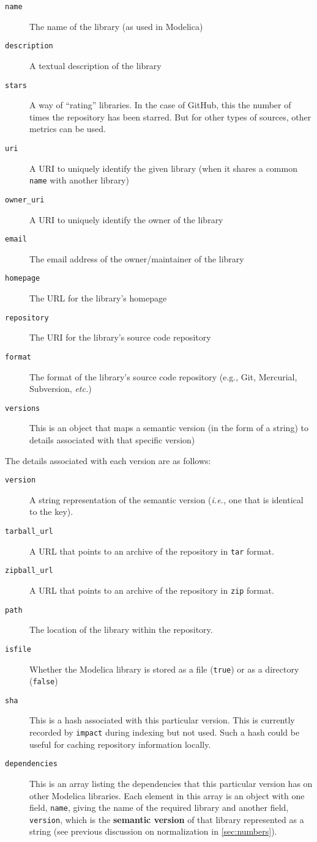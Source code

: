 \documentclass[11pt,a4paper,twocolumn]{article}
\newcommand{\code}[1]{\texttt{#1}} %
\begin{document}
\begin{description}
  \item[\code{name}] The name of the library (as used in Modelica)
  \item[\code{description}] A textual description of the library
  \item[\code{stars}] A way of ``rating'' libraries.  In the case of
    GitHub, this the number of times the repository has been starred.
    But for other types of sources, other metrics can be used.
  \item[\code{uri}] A URI to uniquely identify the given library (when
    it shares a common \code{name} with another library)
  \item[\code{owner\_uri}] A URI to uniquely identify the owner of the
    library
  \item[\code{email}] The email address of the owner/maintainer of the
    library
  \item[\code{homepage}] The URL for the library's homepage
  \item[\code{repository}] The URI for the library's source code
    repository
  \item[\code{format}] The format of the library's source code
    repository (e.g., Git, Mercurial, Subversion, {\it etc.})
  \item[\code{versions}] This is an object that maps a semantic
    version (in the form of a string) to details associated with that
    specific version)
\end{description}

The details associated with each version are as follows:

\begin{description}
  \item[\code{version}] A string representation of the semantic
    version ({\it i.e.,} one that is identical to the key).
  \item[\code{tarball\_url}] A URL that points to an archive of the
    repository in \code{tar} format.
  \item[\code{zipball\_url}] A URL that points to an archive of the
    repository in \code{zip} format.
  \item[\code{path}] The location of the library within the
    repository.
  \item[\code{isfile}] Whether the Modelica library is stored as a
    file (\code{true}) or as a directory (\code{false})
  \item[\code{sha}] This is a hash associated with this particular
    version.  This is currently recorded by \code{impact} during
    indexing but not used.  Such a hash could be useful for caching
    repository information locally.
  \item[\code{dependencies}] This is an array listing the dependencies
    that this particular version has on other Modelica libraries.
    Each element in this array is an object with one field,
    \code{name}, giving the name of the required library and another
    field, \code{version}, which is the {\bf semantic version} of that
    library represented as a string (see previous discussion on
    normalization in \ref{sec:numbers}).
\end{description}
\end{document}
